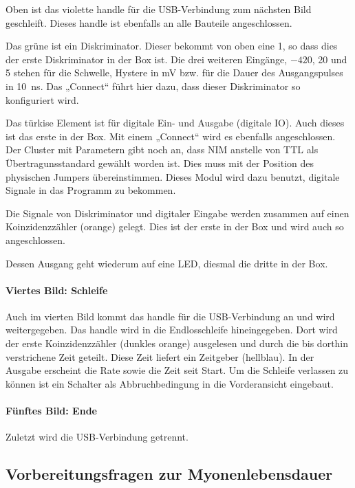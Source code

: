 \documentclass[11pt, ngerman, fleqn, DIV=15, headinclude, BCOR=2cm]{scrreprt}
\begin{document}
Oben ist das violette handle für die USB-Verbindung zum nächsten Bild
geschleift. Dieses handle ist ebenfalls an alle Bauteile angeschlossen.

Das grüne ist ein Diskriminator. Dieser bekommt von oben eine 1, so dass dies
der erste Diskriminator in der Box ist. Die drei weiteren Eingänge, $-420$, 20
und 5 stehen für die Schwelle, Hystere in \si{\milli\volt} bzw. für die Dauer
des Ausgangspulses in \SI{10}{\nano\second}. Das „Connect“ führt hier dazu,
dass dieser Diskriminator so konfiguriert wird.

Das türkise Element ist für digitale Ein- und Ausgabe (digitale IO). Auch
dieses ist das erste in der Box. Mit einem „Connect“ wird es ebenfalls
angeschlossen. Der Cluster mit Parametern gibt noch an, dass NIM anstelle von
TTL als Übertragunsstandard gewählt worden ist. Dies muss mit der Position des
physischen Jumpers übereinstimmen. Dieses Modul wird dazu benutzt, digitale
Signale in das Programm zu bekommen.

Die Signale von Diskriminator und digitaler Eingabe werden zusammen auf einen
Koinzidenzzähler (orange) gelegt. Dies ist der erste in der Box und wird auch
so angeschlossen.

Dessen Ausgang geht wiederum auf eine LED, diesmal die dritte in der Box.

\paragraph{Viertes Bild: Schleife}

Auch im vierten Bild kommt das handle für die USB-Verbindung an und wird
weitergegeben. Das handle wird in die Endlosschleife hineingegeben. Dort wird
der erste Koinzidenzzähler (dunkles orange) ausgelesen und durch die bis
dorthin verstrichene Zeit geteilt. Diese Zeit liefert ein Zeitgeber (hellblau).
In der Ausgabe erscheint die Rate sowie die Zeit seit Start. Um die Schleife
verlassen zu können ist ein Schalter als Abbruchbedingung in die Vorderansicht
eingebaut.

\paragraph{Fünftes Bild: Ende}

Zuletzt wird die USB-Verbindung getrennt.

\subsection{Vorbereitungsfragen zur Myonenlebensdauer}
\end{document}
